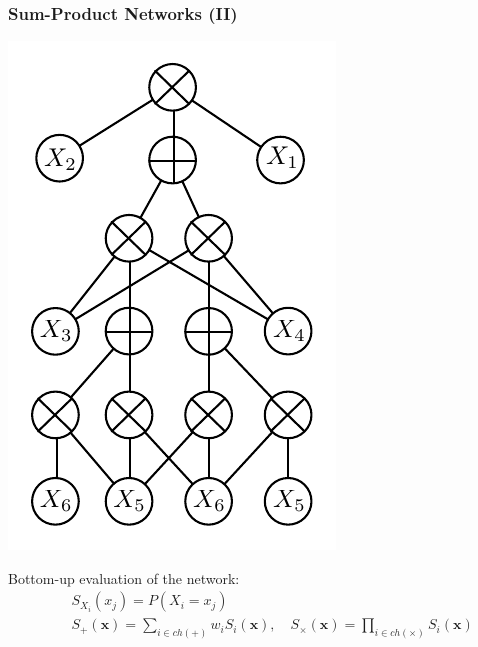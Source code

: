 \documentclass[xcolor={usenames,dvipsnames,svgnames}, compress]{beamer}
\begin{document}
\begin{frame}
  \frametitle{Sum-Product Networks (II)}
  \begin{minipage}{0.35\linewidth}
    \includegraphics[width=0.9\linewidth]{figures/spn-long}
  \end{minipage}\begin{minipage}{0.62\linewidth}
    \footnotesize
    Bottom-up evaluation of the network:
    \begin{align*}
      \quad&S_{X_i}(x_j)=P(X_i=x_j)\\[10pt]
      \quad&S_{+}(\mathbf{x})=\sum\limits_{i\in
                         ch(+)}w_{i}S_{i}(\mathbf{x}),\quad S_{\times}(\mathbf{x})=\prod\limits_{i\in
      ch(\times)}S_{i}(\mathbf{x})
    \end{align*}\\[-7pt]
    

\end{minipage}
\end{frame}
\end{document}
